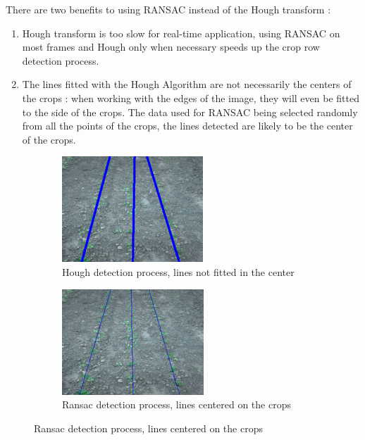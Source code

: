 There are two benefits to using RANSAC instead of the Hough transform :
\begin{enumerate}
  \item Hough transform is too slow for real-time application, using RANSAC on most frames and Hough only when necessary speeds up the crop row detection process. 
  \item The lines fitted with the Hough Algorithm are not necessarily the centers of the crops : when working with the edges of the image, they will even be fitted to the side of the crops. The data used for RANSAC being selected randomly from all the points of the crops, the lines detected are likely to be the center of the crops. 
\end{enumerate} 


\begin{figure}[H]
\centering
\begin{subfigure}{0.49\textwidth}
    \includegraphics[width=\textwidth]{Report/images/houghdetection.png}
    \caption{Hough detection process, lines not fitted in the center }
    \label{fig:first}
\end{subfigure}
\begin{subfigure}{0.49\textwidth}%
    \includegraphics[width=\textwidth]{Report/images/ransacdetection.png}
    \caption{Ransac detection process, lines centered on the crops}
    \label{fig:second}
\end{subfigure}


\end{figure}
